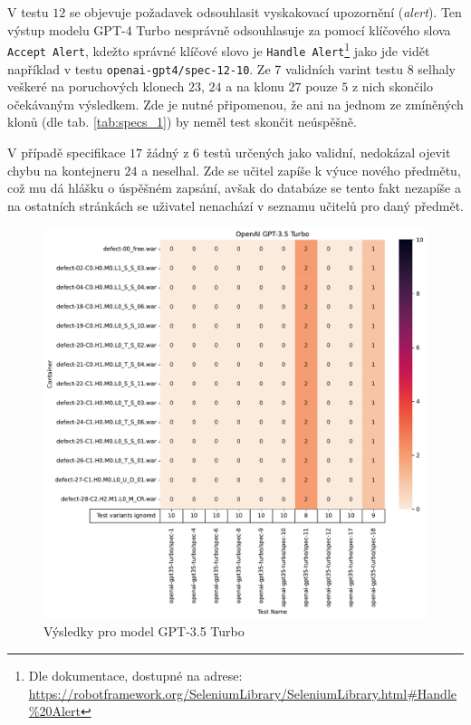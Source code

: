 \documentclass[czech, ma, kiv, he, iso690alph, pdf, viewonly]{fasthesis}
\begin{document}
            V testu \(12\) se objevuje požadavek odsouhlasit vyskakovací upozornění (\textit{alert}). Ten výstup modelu GPT-4 Turbo nesprávně odsouhlasuje za pomocí klíčového slova \verb|Accept Alert|, kdežto správné klíčové slovo je \verb|Handle Alert|\footnote{Dle dokumentace, dostupné na adrese: \url{https://robotframework.org/SeleniumLibrary/SeleniumLibrary.html#Handle\%20Alert}} jako jde vidět například v testu \verb|openai-gpt4/spec-12-10|. Ze 7 validních varint testu \(8\) selhaly veškeré na poruchových klonech \(23\), \(24\) a na klonu \(27\) pouze \(5\) z nich skončilo očekávaným výsledkem. Zde je nutné připomenou, že ani na jednom ze zmíněných klonů (dle tab. \ref{tab:specs_1}) by neměl test skončit neúspěšně.

            V případě specifikace \(17\) žádný z 6 testů určených jako validní, nedokázal ojevit chybu na kontejneru \(24\) a neselhal. Zde se učitel zapíše k výuce nového předmětu, což mu dá hlášku o úspěšném zapsání, avšak do databáze se tento fakt nezapíše a na ostatních stránkách se uživatel nenachází v seznamu učitelů pro daný předmět.


            \begin{figure}
                \includegraphics[width=\textwidth]{pic/gpt-3.5-turbo-results.pdf}
                \caption{Výsledky pro model GPT-3.5 Turbo}
                \label{fig:res:gpt-35-turbo}
            \end{figure}
\end{document}
